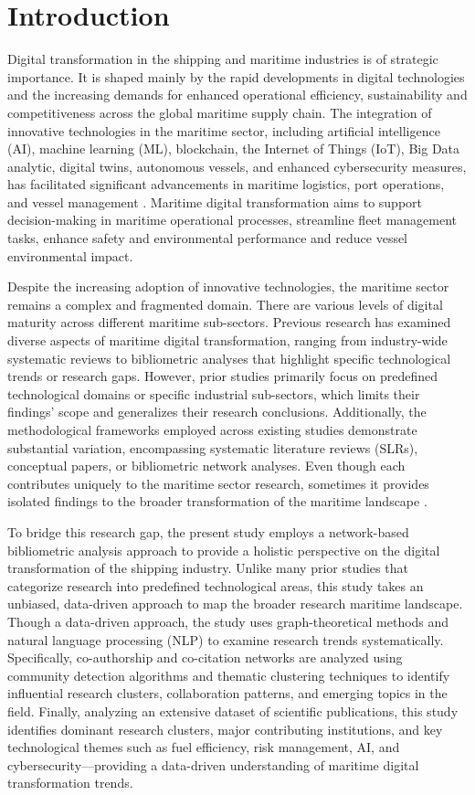 \documentclass[a4paper, review, endfloat, doubleblind, authoryear]{elsarticle}
\begin{document}
	\section{Introduction}
	Digital transformation in the shipping and maritime industries is of strategic importance. It is shaped mainly by the rapid developments in digital technologies and the increasing demands for enhanced operational efficiency, sustainability and competitiveness across the global maritime supply chain. The integration of innovative technologies in the maritime sector, including artificial intelligence (AI), machine learning (ML), blockchain, the Internet of Things (IoT), Big Data analytic, digital twins, autonomous vessels, and enhanced cybersecurity measures, has facilitated significant advancements in maritime logistics, port operations, and vessel management \citep{tijan2021digital,an2024maritime}. Maritime digital transformation aims to support decision-making in maritime operational processes, streamline fleet management tasks, enhance safety and environmental performance and reduce vessel environmental impact.
	
	Despite the increasing adoption of innovative technologies, the maritime sector remains a complex and fragmented domain. There are various levels of digital maturity across different maritime sub-sectors. Previous research has examined diverse aspects of maritime digital transformation, ranging from industry-wide systematic reviews to bibliometric analyses that highlight specific technological trends or research gaps. However, prior studies primarily focus on predefined technological domains or specific industrial sub-sectors, which limits their findings' scope and generalizes their research conclusions. Additionally, the methodological frameworks employed across existing studies demonstrate substantial variation, encompassing systematic literature reviews (SLRs), conceptual papers, or bibliometric network analyses. Even though each contributes uniquely to the maritime sector research, sometimes it provides isolated findings to the broader transformation of the maritime landscape \citep{lau2024maritime,ouguz2024studies}. 
	
	To bridge this research gap, the present study employs a network-based bibliometric analysis approach to provide a holistic perspective on the digital transformation of the shipping industry. Unlike many prior studies that categorize research into predefined technological areas, this study takes an unbiased, data-driven approach to map the broader research maritime landscape. Though a data-driven approach, the study uses graph-theoretical methods and natural language processing (NLP) to examine research trends systematically. Specifically, co-authorship and co-citation networks are analyzed using community detection algorithms and thematic clustering techniques to identify influential research clusters, collaboration patterns, and emerging topics in the field. Finally, analyzing an extensive dataset of scientific publications, this study identifies dominant research clusters, major contributing institutions, and key technological themes such as fuel efficiency, risk management, AI, and cybersecurity—providing a data-driven understanding of maritime digital transformation trends.
	
\end{document}
